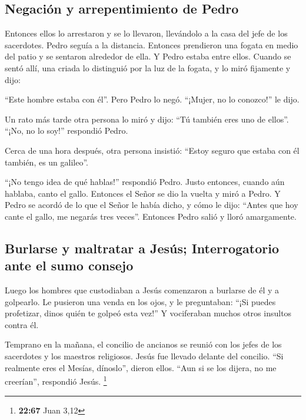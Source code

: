 \hypertarget{negaciuxf3n-y-arrepentimiento-de-pedro}{%
\subsection{Negación y arrepentimiento de
Pedro}\label{negaciuxf3n-y-arrepentimiento-de-pedro}}

 Entonces ellos lo arrestaron y se lo llevaron,
llevándolo a la casa del jefe de los sacerdotes. Pedro seguía a la
distancia.  Entonces prendieron una fogata en medio del
patio y se sentaron alrededor de ella. Y Pedro estaba entre ellos.
 Cuando se sentó allí, una criada lo distinguió por la
luz de la fogata, y lo miró fijamente y dijo:

 ``Este hombre estaba con él''. Pero Pedro lo negó.
``¡Mujer, no lo conozco!'' le dijo.

 Un rato más tarde otra persona lo miró y dijo: ``Tú
también eres uno de ellos''. ``¡No, no lo soy!'' respondió Pedro.

 Cerca de una hora después, otra persona insistió:
``Estoy seguro que estaba con él también, es un galileo''.

 ``¡No tengo idea de qué hablas!'' respondió Pedro. Justo
entonces, cuando aún hablaba, canto el gallo. Entonces el Señor se dio
la vuelta y miró a Pedro.  Y Pedro se acordó de lo que el
Señor le había dicho, y cómo le dijo: ``Antes que hoy cante el gallo, me
negarás tres veces''.  Entonces Pedro salió y lloró
amargamente.

\hypertarget{burlarse-y-maltratar-a-jesuxfas-interrogatorio-ante-el-sumo-consejo}{%
\subsection{Burlarse y maltratar a Jesús; Interrogatorio ante el sumo
consejo}\label{burlarse-y-maltratar-a-jesuxfas-interrogatorio-ante-el-sumo-consejo}}

 Luego los hombres que custodiaban a Jesús comenzaron a
burlarse de él y a golpearlo.  Le pusieron una venda en
los ojos, y le preguntaban: ``¡Si puedes profetizar, dinos quién te
golpeó esta vez!''  Y vociferaban muchos otros insultos
contra él.

 Temprano en la mañana, el concilio de ancianos se reunió
con los jefes de los sacerdotes y los maestros religiosos. Jesús fue
llevado delante del concilio.  ``Si realmente eres el
Mesías, dínoslo'', dieron ellos. ``Aun si se los dijera, no me
creerían'', respondió Jesús. \footnote{\textbf{22:67} Juan 3,12}


